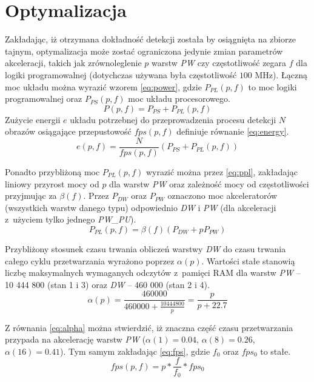 \section{Optymalizacja}

Zakładając, iż otrzymana dokładność detekcji została by osiągnięta na zbiorze tajnym, optymalizacja może zostać ograniczona jedynie zmian parametrów akceleracji, takich jak zrównoleglenie $p$ warstw \emph{PW} czy częstotliwość zegara $f$ dla logiki programowalnej (dotychczas używana była częstotliwość $100$ MHz).
Łączną moc układu można wyrazić wzorem \eqref{eq:power}, gdzie $P_{PL}(p,f)$ to moc logiki programowalnej oraz $P_{PS}(p,f)$ moc układu procesorowego.
\begin{equation}
P(p,f) = P_{PS} + P_{PL}(p,f)
\label{eq:power}
\end{equation}
Zużycie energii $e$ układu potrzebnej do przeprowadzenia procesu detekcji $N$ obrazów osiągające przepustowość $fps(p,f)$ definiuje równanie \eqref{eq:energy}.
\begin{equation}
e(p,f) = \frac{N}{fps(p,f)}(P_{PS} + P_{PL}(p,f))
\label{eq:energy}
\end{equation}

Ponadto przybliżoną moc $P_{PL}(p,f)$ wyrazić można przez \eqref{eq:ppl}, zakładając liniowy przyrost mocy od $p$ dla warstw \emph{PW} oraz zależność mocy od częstotliwości przyjmując za $\beta(f)$. Przez $P_{DW}$ oraz $P_{PW}$ oznaczono moc akceleratorów (wszystkich warstw danego typu) odpowiednio \emph{DW} i \emph{PW} (dla akceleracji z~użyciem tylko jednego \emph{PW\_PU}).
\begin{equation}
P_{PL}(p,f) = \beta(f) (P_{DW} + p P_{PW})
\label{eq:ppl}
\end{equation}

Przybliżony stosunek czasu trwania obliczeń warstwy \emph{DW} do czasu trwania całego cyklu przetwarzania wyrażono poprzez $\alpha(p)$. 
Wartości stałe stanowią liczbę maksymalnych wymaganych odczytów z~pamięci RAM dla  warstw \emph{PW} -- 10 444 800 (stan 1 i 3) oraz \emph{DW} -- 460 000 (stan 2 i 4).
\begin{equation}
\alpha(p) = \frac{460 000}{460 000 + \frac{10 444 800}{p}} = \frac{p}{p+22.7}
\label{eq:alpha}
\end{equation}

Z równania \eqref{eq:alpha} można stwierdzić, iż znaczna część czasu przetwarzania przypada na akcelerację warstw \emph{PW} ($\alpha(1) = 0.04$, $\alpha(8) = 0.26$,  $\alpha(16) = 0.41$).
Tym samym zakładając \eqref{eq:fps}, gdzie $f_0$ oraz $fps_0$ to stałe.
\begin{equation}
fps(p,f) = p*\frac{f}{f_0}* fps_0
\label{eq:fps}
\end{equation}

